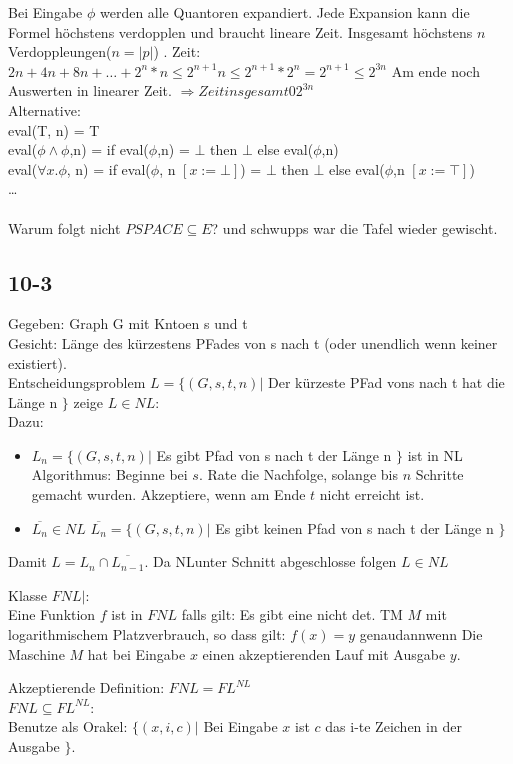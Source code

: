 \documentclass[12pt, oneside, a4paper, numbers=enddot, abstracton, parskip=full]{scrreprt}
\begin{document}
Bei Eingabe $\phi$ werden alle Quantoren expandiert. Jede Expansion
kann die Formel höchstens verdopplen und braucht lineare
Zeit. Insgesamt höchstens $n$ Verdoppleungen($n=|p|$) .
Zeit: $2n + 4n +8n+ \dots + 2^n * n \leq 2^{n+1} n \leq 2^{n+1} * 2^{n} = 2^{n+1} \leq 2^{3n}$
Am ende noch Auswerten in linearer Zeit.
$\Rightarrow Zeit insgesamt \mathcal{0} 2^{3n}$ \\

Alternative:\\
eval(T, n) = T \\
eval($\phi \land \phi$,n) = if eval($\phi$,n) = $\bot$ then $\bot$ else eval($\phi$,n) \\
eval($\forall x.\phi$, n) = if eval($\phi$,  n $[ x:= \bot ]$) = $\bot$ then $\bot$ else eval($\phi$,n $[ x := \top ]$) \\
\dots \\
\\
Warum folgt nicht $PSPACE \subseteq E$? und schwupps war die Tafel wieder gewischt.

\subsection{10-3}
Gegeben: Graph G mit Kntoen s und t \\
Gesicht: Länge des kürzestens PFades von s nach t (oder unendlich wenn keiner existiert). \\

Entscheidungsproblem $L= \{(G,s,t,n) |$ Der kürzeste PFad vons nach t hat die Länge n $\}$
zeige $L\in NL$:\\
Dazu:
\begin{itemize}
\item $L_n = \{(G,s,t,n) |$ Es gibt Pfad von s nach t der Länge n $\}$ ist in NL \\
Algorithmus: Beginne bei $s$. Rate die Nachfolge, solange bis $n$ Schritte
gemacht wurden. Akzeptiere, wenn am Ende $t$ nicht erreicht ist.
\item $\overline{L_n} \in NL$ $\overline{L_n} = \{(G,s,t,n) |$ Es gibt keinen Pfad von s nach t der Länge n $\}$
\end{itemize}

Damit $L=L_n \cap \overline{L_{n-1}}$. Da NLunter Schnitt abgeschlosse folgen $L\in NL$

Klasse $FNL|$:\\
Eine Funktion $f$ ist in $FNL$ falls gilt: Es gibt eine nicht det. TM $M$ mit logarithmischem Platzverbrauch, so dass gilt:
$f(x) = y$ genaudannwenn Die Maschine $M$ hat bei Eingabe $x$ einen akzeptierenden Lauf mit Ausgabe $y$.

Akzeptierende Definition: $FNL = FL^{NL}$ \\
$FNL\subseteq FL^{NL}$:\\
Benutze als Orakel: $\{ (x,i,c)|$ Bei Eingabe $x$ ist $c$ das i-te Zeichen in der Ausgabe $\}$.
\end{document}
